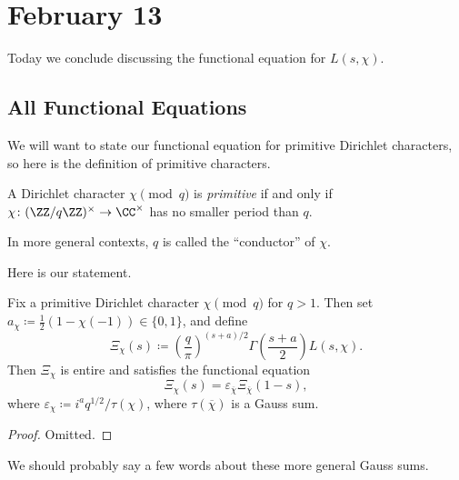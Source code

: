 \documentclass[../notes.tex]{subfiles}
\begin{document}
\section{February 13}

Today we conclude discussing the functional equation for $L(s,\chi)$.

\subsection{All Functional Equations}
We will want to state our functional equation for primitive Dirichlet characters, so here is the definition of primitive characters.
\begin{definition}[primitive]
	A Dirichlet character $\chi\pmod q$ is \textit{primitive} if and only if $\chi\colon(\ZZ/q\ZZ)^\times\to\CC^\times$ has no smaller period than $q$.
\end{definition}
\begin{remark}
	In more general contexts, $q$ is called the ``conductor'' of $\chi$.
\end{remark}
Here is our statement.
\begin{theorem} \label{thm:l-chi-func-eq}
	Fix a primitive Dirichlet character $\chi\pmod q$ for $q>1$. Then set $a_\chi\coloneqq\frac12(1-\chi(-1))\in\{0,1\}$, and define
	\[\Xi_\chi(s)\coloneqq\left(\frac q\pi\right)^{(s+a)/2}\Gamma\left(\frac{s+a}2\right)L(s,\chi).\]
	Then $\Xi_\chi$ is entire and satisfies the functional equation
	\[\Xi_\chi(s)=\varepsilon_{\overline\chi}\Xi_{\overline\chi}(1-s),\]
	where $\varepsilon_\chi\coloneqq i^aq^{1/2}/\tau(\chi)$, where $\tau(\overline\chi)$ is a Gauss sum.
\end{theorem}
\begin{proof}
	Omitted.
\end{proof}
We should probably say a few words about these more general Gauss sums.
\end{document}
